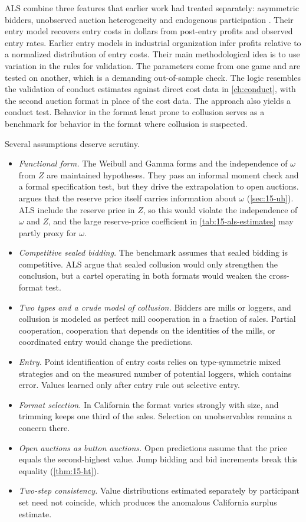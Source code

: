 ALS combine three features that earlier work had treated separately: asymmetric bidders, unobserved
auction heterogeneity and endogenous participation \citep[p.~255]{AtheyLevinSeira2011}. Their entry model
recovers entry costs in dollars from post-entry profits and observed entry rates. Earlier entry models in
industrial organization infer profits relative to a normalized distribution of entry costs. Their main
methodological idea is to use variation in the rules for validation. The parameters come from one game and
are tested on another, which is a demanding out-of-sample check. The logic resembles the validation of
conduct estimates against direct cost data in \cref{ch:conduct}, with the second auction format in place of
the cost data. The approach also yields a conduct test. Behavior in the format least prone to collusion
serves as a benchmark for behavior in the format where collusion is suspected.

Several assumptions deserve scrutiny.
\begin{itemize}
\item \emph{Functional form.} The Weibull and Gamma forms and the independence of $\omega$ from $Z$ are
maintained hypotheses. They pass an informal moment check and a formal specification test, but they drive
the extrapolation to open auctions. \citet{Roberts2013} argues that the reserve price itself carries
information about $\omega$ (\cref{sec:15-uh}). ALS include the reserve price in $Z$, so this would violate
the independence of $\omega$ and $Z$, and the large reserve-price coefficient in \cref{tab:15-als-estimates}
may partly proxy for $\omega$.
\item \emph{Competitive sealed bidding.} The benchmark assumes that sealed bidding is competitive. ALS
argue that sealed collusion would only strengthen the conclusion, but a cartel operating in both formats
would weaken the cross-format test.
\item \emph{Two types and a crude model of collusion.} Bidders are mills or loggers, and collusion is
modeled as perfect mill cooperation in a fraction of sales. Partial cooperation, cooperation that depends
on the identities of the mills, or coordinated entry would change the predictions.
\item \emph{Entry.} Point identification of entry costs relies on type-symmetric mixed strategies and on
the measured number of potential loggers, which contains error. Values learned only after entry rule out
selective entry.
\item \emph{Format selection.} In California the format varies strongly with size, and trimming keeps one
third of the sales. Selection on unobservables remains a concern there.
\item \emph{Open auctions as button auctions.} Open predictions assume that the price equals the
second-highest value. Jump bidding and bid increments break this equality (\cref{thm:15-ht}).
\item \emph{Two-step consistency.} Value distributions estimated separately by participant set need not
coincide, which produces the anomalous California surplus estimate.
\end{itemize}

